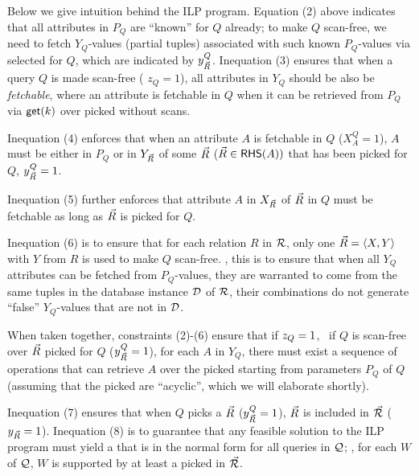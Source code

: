  \vspace{0.6ex}
Below we give intuition behind the ILP program.
Equation (2) above indicates that all
attributes in $P_{Q}$ are ``known'' for $Q$ already; to make
$Q$ scan-free, we need to fetch $Y_{Q}$-values (partial tuples) associated
with such known $P_{Q}$-values via selected \bss for
$Q$, which are indicated by $y_{\vec{R}}^{Q}$.
Inequation (3) ensures that when a query $Q$ is made scan-free (\ie
$z_{Q} = 1$), all attributes in $Y_{Q}$ should be also be
{\em fetchable}, where an attribute is fetchable in $Q$
when it can be retrieved from $P_{Q}$ via $\protect\mathsf{get}(k)$ over picked
\bss without scans.


\vspace{0.6ex}
Inequation (4) enforces that when an attribute $A$ is fetchable in
$Q$ (\ie $X_{A}^{Q} = 1$), $A$ must be either in $P_{Q}$ or
in $Y_{\vec{R}}$ of some \bs $\vec{R}$ ($\vec{R} \in {\ensuremath {\mathsf{RHS}}}(A))$
that has been picked for $Q$, \ie $y_{\vec{R}}^{Q} = 1$.

Inequation (5) further enforces that attribute $A$ in $X_{\vec{R}}$
of $\vec{R}$ in $Q$ must be fetchable as long as %
$\vec{R}$ is picked for $Q$.

\vspace{0.6ex}
Inequation (6) is to ensure that for each relation $R$ in ${\mathcal R}$,
only one \bs $\vec{R} \allowbreak =\allowbreak \langle X,\allowbreak Y\rangle$ with $Y$ from $R$ is used
to make $Q$ scan-free.
, this is to ensure that when all $Y_{Q}$ attributes
can be fetched from $P_{Q}$-values, they are warranted to come from
the same tuples in the database instance $\mathcal D$ of ${\mathcal R}$, \ie their
combinations do not generate ``false'' $Y_{Q}$-values that are
not in $\mathcal D$.

\vspace{0.8ex}
When taken together,
constraints (2)-(6) ensure that if $z_{Q}\allowbreak
=\allowbreak 1$, \ie~if $Q$ is scan-free over \bss $\vec{R}$ picked for $Q$
($y_{\vec{R}}^{Q}\allowbreak =\allowbreak 1$), for each $A$ in $Y_{Q}$,
there must exist a sequence of \get operations that can retrieve
$A$ over the picked \bss starting from parameters $P_{Q}$ of $Q$
(assuming that the picked \bss are ``acyclic'', which we will
elaborate shortly).

\vspace{0.6ex}
Inequation (7) ensures that when $Q$ picks a \bs $\vec{R}$
($y_{\vec{R}}^{Q} = 1$), $\vec{R}$ is included in \bds $\vec{{\mathcal R}}$
($y_{\vec{R}} = 1$).
%
Inequation (8) is to guarantee that any feasible solution to the
ILP program must yield a \bds that is in the normal form for all
queries in $\mathcal Q$; ,
for each \qcs $W$ of $\mathcal Q$, $W$ is supported by
at least a \bs picked in $\vec{{\mathcal R}}$.%


